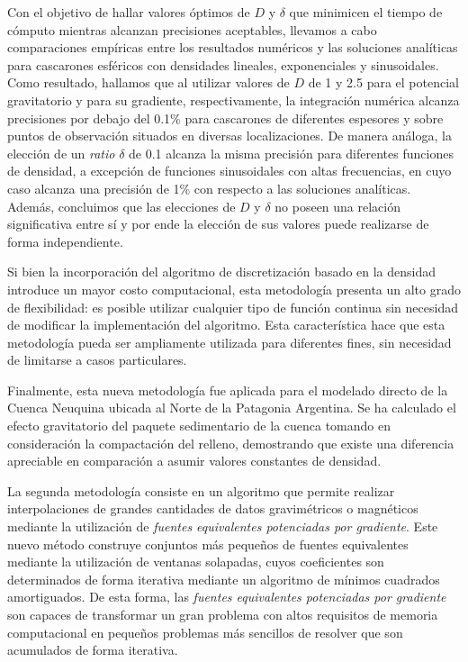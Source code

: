 Con el objetivo de hallar valores óptimos de $D$ y $\delta$ que minimicen el
tiempo de cómputo mientras alcanzan precisiones aceptables, llevamos a cabo
comparaciones empíricas entre los resultados numéricos y las soluciones
analíticas para cascarones esféricos con densidades lineales, exponenciales
y sinusoidales.
Como resultado, hallamos que al utilizar valores de $D$ de 1 y 2.5 para el
potencial gravitatorio y para su gradiente, respectivamente, la integración
numérica alcanza precisiones por debajo del 0.1\% para cascarones de diferentes
espesores y sobre puntos de observación situados en diversas localizaciones.
De manera análoga, la elección de un \emph{ratio} $\delta$ de 0.1 alcanza la
misma precisión para diferentes funciones de densidad, a excepción de funciones
sinusoidales con altas frecuencias, en cuyo caso alcanza una precisión de 1\%
con respecto a las soluciones analíticas.
Además, concluimos que las elecciones de $D$ y $\delta$ no poseen una relación
significativa entre sí y por ende la elección de sus valores puede realizarse
de forma independiente.

Si bien la incorporación del algoritmo de discretización basado en la densidad
introduce un mayor costo computacional, esta metodología presenta un alto grado
de flexibilidad: es posible utilizar cualquier tipo de función continua sin
necesidad de modificar la implementación del algoritmo.
Esta característica hace que esta metodología pueda ser ampliamente utilizada
para diferentes fines, sin necesidad de limitarse a casos particulares.

Finalmente, esta nueva metodología fue aplicada para el modelado directo de la
Cuenca Neuquina ubicada al Norte de la Patagonia Argentina.
Se ha calculado el efecto gravitatorio del paquete sedimentario de la cuenca
tomando en consideración la compactación del relleno, demostrando que existe
una diferencia apreciable en comparación a asumir valores constantes de
densidad.

\vspace{1em}

La segunda metodología consiste en un algoritmo que permite realizar
interpolaciones de grandes cantidades de datos gravimétricos o magnéticos
mediante la utilización de \emph{fuentes equivalentes potenciadas por
gradiente}.
Este nuevo método construye conjuntos más pequeños de fuentes equivalentes
mediante la utilización de ventanas solapadas, cuyos coeficientes son
determinados de forma iterativa mediante un algoritmo de mínimos cuadrados
amortiguados.
De esta forma, las \emph{fuentes equivalentes potenciadas por gradiente} son
capaces de transformar un gran problema con altos requisitos de memoria
computacional en pequeños problemas más sencillos de resolver que son
acumulados de forma iterativa.

